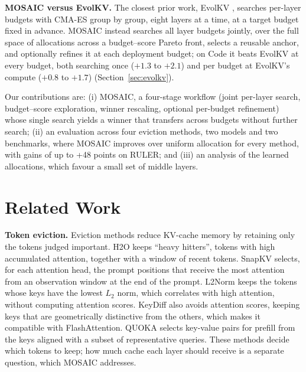 \documentclass[11pt]{article}
\begin{document}
\textbf{MOSAIC versus EvolKV.}\label{sec:intro-evolkv} The closest prior work, EvolKV \citep{yu2025evolkv}, searches per-layer budgets with CMA-ES group by group, eight layers at a time, at a target budget fixed in advance. MOSAIC instead searches all layer budgets jointly, over the full space of allocations across a budget--score Pareto front, selects a reusable anchor, and optionally refines it at each deployment budget; on Code it beats EvolKV at every budget, both searching once ($+1.3$ to $+2.1$) and per budget at EvolKV's compute ($+0.8$ to $+1.7$) (Section~\ref{sec:evolkv}).

Our contributions are: (i) MOSAIC, a four-stage workflow (joint per-layer search, budget--score exploration, winner rescaling, optional per-budget refinement) whose single search yields a winner that transfers across budgets without further search; (ii) an evaluation across four eviction methods, two models and two benchmarks, where MOSAIC improves over uniform allocation for every method, with gains of up to +48 points on RULER; and (iii) an analysis of the learned allocations, which favour a small set of middle layers.

\section{Related Work}

\textbf{Token eviction.} Eviction methods reduce KV-cache memory by retaining only the tokens judged important. H2O \citep{zhang2023h2o} keeps ``heavy hitters'', tokens with high accumulated attention, together with a window of recent tokens. SnapKV \citep{li2024snapkv} selects, for each attention head, the prompt positions that receive the most attention from an observation window at the end of the prompt. L2Norm \citep{devoto2024l2norm} keeps the tokens whose keys have the lowest $L_2$ norm, which correlates with high attention, without computing attention scores. KeyDiff \citep{park2025keydiff} also avoids attention scores, keeping keys that are geometrically distinctive from the others, which makes it compatible with FlashAttention. QUOKA \citep{jones2026quoka} selects key-value pairs for prefill from the keys aligned with a subset of representative queries. These methods decide which tokens to keep; how much cache each layer should receive is a separate question, which MOSAIC addresses.
\end{document}
